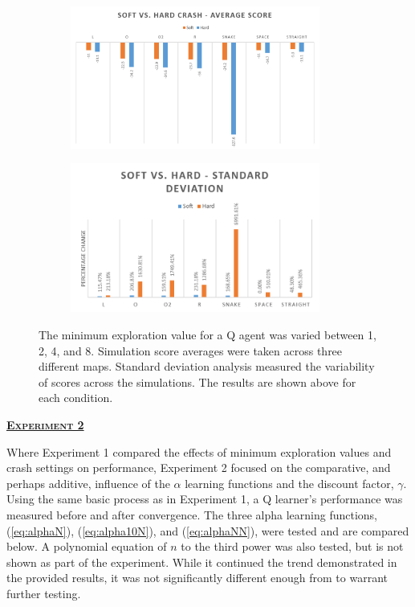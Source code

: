 \documentclass[12pt, letter]{article}
\newlength{\remaining}
\newcommand{\titleline}[1]{%
\setlength{\remaining}{\textwidth-\widthof{\textsc{#1}}}
\noindent\underline{\textsc{\textbf{#1}}\hspace*{\remaining}}\par}
\begin{document}
\begin{figure}[h!] 
    \centering
    \begin{subfigure}[b]{0.48\textwidth}
        \includegraphics[width=0.9\textwidth]{img/softVhard/VI/AvgScore}
    \end{subfigure}
    \begin{subfigure}[b]{0.48\textwidth}
        \includegraphics[width=0.9\textwidth]{img/softVhard/VI/StDev}
    \end{subfigure}
    \caption{The minimum exploration value for a Q agent was varied between 1, 2, 4, and 8.  Simulation score averages were taken across three different maps. Standard deviation analysis measured the variability of scores across the simulations. The results are shown above for each condition.}
    \label{fig:svhVIAvgScoreStDev}
\end{figure}
\vspace{-.25em}

\titleline{Experiment 2}
Where Experiment 1 compared the effects of minimum exploration values and crash settings on performance, Experiment 2 focused on the comparative, and perhaps additive, influence of the $\alpha$ learning functions and the discount factor, $\gamma$.  Using the same basic process as in Experiment 1, a Q learner's performance was measured before and after convergence.  The three alpha learning functions, (\ref{eq:alphaN}), (\ref{eq:alpha10N}), and (\ref{eq:alphaNN}), were tested and are compared below.  A polynomial equation of $n$ to the third power was also tested, but is not shown as part of the experiment. While it continued the trend demonstrated in the provided results, it was not significantly different enough from  to warrant further testing.
\end{document}

